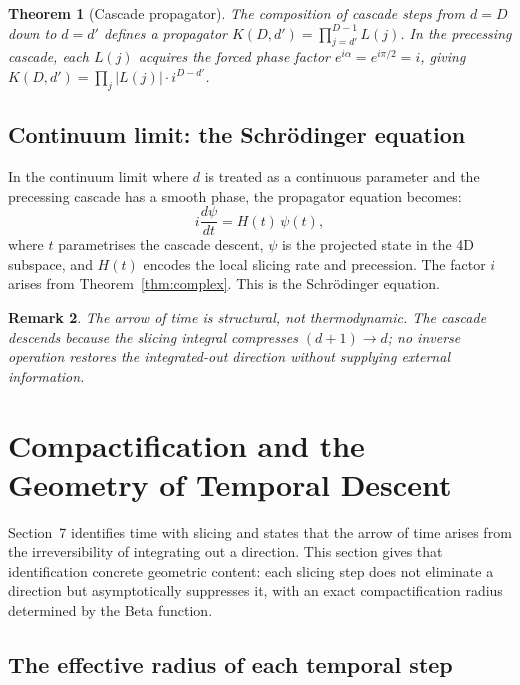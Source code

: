 \documentclass[12pt,a4paper]{article}
\newtheorem{theorem}{Theorem}[section]
\newtheorem{remark}[theorem]{Remark}
\begin{document}
\begin{theorem}[Cascade propagator]\label{thm:propagator}
The composition of cascade steps from $d=D$ down to $d=d'$ defines a propagator
$K(D,d')=\prod_{j=d'}^{D-1}L(j)$. In the precessing cascade, each $L(j)$ acquires the
forced phase factor $e^{i\alpha}=e^{i\pi/2}=i$, giving
$K(D,d')=\prod_j|L(j)|\cdot i^{D-d'}$.
\end{theorem}

\subsection{Continuum limit: the Schr\"{o}dinger equation}

In the continuum limit where $d$ is treated as a continuous parameter and the precessing
cascade has a smooth phase, the propagator equation becomes:
\[
i\frac{d\psi}{dt} = H(t)\,\psi(t),
\]
where $t$ parametrises the cascade descent, $\psi$ is the projected state in the 4D
subspace, and $H(t)$ encodes the local slicing rate and precession. The factor $i$ arises
from Theorem~\ref{thm:complex}. This is the Schr\"{o}dinger equation.

\begin{remark}
The arrow of time is structural, not thermodynamic. The cascade descends because the slicing
integral compresses $(d+1)\to d$; no inverse operation restores the integrated-out direction
without supplying external information.
\end{remark}

\section{Compactification and the Geometry of Temporal Descent}
\label{sec:compactification}

Section~7 identifies time with slicing and states that the arrow of time arises from the
irreversibility of integrating out a direction. This section gives that identification
concrete geometric content: each slicing step does not eliminate a direction but
asymptotically suppresses it, with an exact compactification radius determined by the Beta
function.

\subsection{The effective radius of each temporal step}
\end{document}
